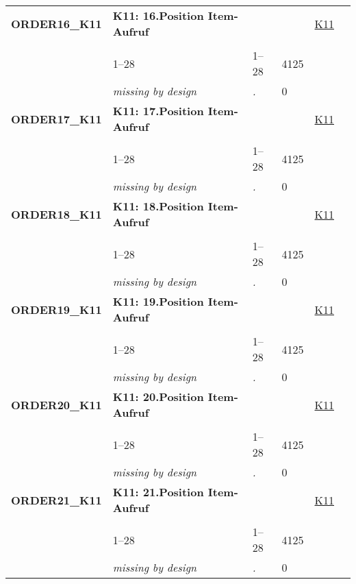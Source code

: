 \begin{longtable}{| L{2.45cm} | L{6cm} | C{1.5cm} | R{1cm} | C{2.25cm} | C{2.25cm} |}
   \midrule
\textbf{ORDER16\_K11}\label{var:ORDER16:K11} & \textbf{K11: 16.Position Item-Aufruf} &  &  & \hyperref[K11]{K11} & \hyperref[var:suf:]{} \\ 
   &  &  &  &  &  \\ 
   & 1--28 & 1--28 & 4125 &  &  \\ 
   & \textit{missing by design} & \textit{.} & 0 &  &  \\ 
   \midrule
\textbf{ORDER17\_K11}\label{var:ORDER17:K11} & \textbf{K11: 17.Position Item-Aufruf} &  &  & \hyperref[K11]{K11} & \hyperref[var:suf:]{} \\ 
   &  &  &  &  &  \\ 
   & 1--28 & 1--28 & 4125 &  &  \\ 
   & \textit{missing by design} & \textit{.} & 0 &  &  \\ 
   \midrule
\textbf{ORDER18\_K11}\label{var:ORDER18:K11} & \textbf{K11: 18.Position Item-Aufruf} &  &  & \hyperref[K11]{K11} & \hyperref[var:suf:]{} \\ 
   &  &  &  &  &  \\ 
   & 1--28 & 1--28 & 4125 &  &  \\ 
   & \textit{missing by design} & \textit{.} & 0 &  &  \\ 
   \midrule
\textbf{ORDER19\_K11}\label{var:ORDER19:K11} & \textbf{K11: 19.Position Item-Aufruf} &  &  & \hyperref[K11]{K11} & \hyperref[var:suf:]{} \\ 
   &  &  &  &  &  \\ 
   & 1--28 & 1--28 & 4125 &  &  \\ 
   & \textit{missing by design} & \textit{.} & 0 &  &  \\ 
   \midrule
\textbf{ORDER20\_K11}\label{var:ORDER20:K11} & \textbf{K11: 20.Position Item-Aufruf} &  &  & \hyperref[K11]{K11} & \hyperref[var:suf:]{} \\ 
   &  &  &  &  &  \\ 
   & 1--28 & 1--28 & 4125 &  &  \\ 
   & \textit{missing by design} & \textit{.} & 0 &  &  \\ 
   \midrule
\textbf{ORDER21\_K11}\label{var:ORDER21:K11} & \textbf{K11: 21.Position Item-Aufruf} &  &  & \hyperref[K11]{K11} & \hyperref[var:suf:]{} \\ 
   &  &  &  &  &  \\ 
   & 1--28 & 1--28 & 4125 &  &  \\ 
   & \textit{missing by design} & \textit{.} & 0 &  &  \\ 

\end{longtable}
